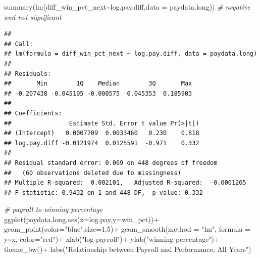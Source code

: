 \documentclass[
  12pt,
]{article}
\newenvironment{Shaded}{\begin{snugshade}}{\end{snugshade}}
\newcommand{\AttributeTok}[1]{\textcolor[rgb]{0.77,0.63,0.00}{#1}}
\newcommand{\CommentTok}[1]{\textcolor[rgb]{0.56,0.35,0.01}{\textit{#1}}}
\newcommand{\FloatTok}[1]{\textcolor[rgb]{0.00,0.00,0.81}{#1}}
\newcommand{\FunctionTok}[1]{\textcolor[rgb]{0.00,0.00,0.00}{#1}}
\newcommand{\NormalTok}[1]{#1}
\newcommand{\SpecialCharTok}[1]{\textcolor[rgb]{0.00,0.00,0.00}{#1}}
\newcommand{\StringTok}[1]{\textcolor[rgb]{0.31,0.60,0.02}{#1}}
\begin{document}
\begin{Shaded}
\begin{Highlighting}[]
\FunctionTok{summary}\NormalTok{(}\FunctionTok{lm}\NormalTok{(diff\_win\_pct\_next}\SpecialCharTok{\textasciitilde{}}\NormalTok{log.pay.diff,}\AttributeTok{data =}\NormalTok{ paydata.long)) }\CommentTok{\# negative and not significant}
\end{Highlighting}
\end{Shaded}

\begin{verbatim}
## 
## Call:
## lm(formula = diff_win_pct_next ~ log.pay.diff, data = paydata.long)
## 
## Residuals:
##       Min        1Q    Median        3Q       Max 
## -0.207438 -0.045105 -0.000575  0.045353  0.185903 
## 
## Coefficients:
##                Estimate Std. Error t value Pr(>|t|)
## (Intercept)   0.0007709  0.0033460   0.230    0.818
## log.pay.diff -0.0121974  0.0125591  -0.971    0.332
## 
## Residual standard error: 0.069 on 448 degrees of freedom
##   (60 observations deleted due to missingness)
## Multiple R-squared:  0.002101,   Adjusted R-squared:  -0.0001265 
## F-statistic: 0.9432 on 1 and 448 DF,  p-value: 0.332
\end{verbatim}

\begin{Shaded}
\begin{Highlighting}[]
\CommentTok{\# payroll to winning percentage}
\FunctionTok{ggplot}\NormalTok{(paydata.long,}\FunctionTok{aes}\NormalTok{(}\AttributeTok{x=}\NormalTok{log.pay,}\AttributeTok{y=}\NormalTok{win\_pct))}\SpecialCharTok{+}
  \FunctionTok{geom\_point}\NormalTok{(}\AttributeTok{color=}\StringTok{"blue"}\NormalTok{,}\AttributeTok{size=}\FloatTok{1.5}\NormalTok{)}\SpecialCharTok{+}
  \FunctionTok{geom\_smooth}\NormalTok{(}\AttributeTok{method =} \StringTok{"lm"}\NormalTok{, }\AttributeTok{formula =}\NormalTok{ y}\SpecialCharTok{\textasciitilde{}}\NormalTok{x, }\AttributeTok{color=}\StringTok{"red"}\NormalTok{)}\SpecialCharTok{+}
  \FunctionTok{xlab}\NormalTok{(}\StringTok{"log payroll"}\NormalTok{)}\SpecialCharTok{+}
  \FunctionTok{ylab}\NormalTok{(}\StringTok{"winning percentage"}\NormalTok{)}\SpecialCharTok{+}
  \FunctionTok{theme\_bw}\NormalTok{()}\SpecialCharTok{+}
  \FunctionTok{labs}\NormalTok{(}\StringTok{"Relationship between Payroll and Performance, All Years"}\NormalTok{)}
\end{Highlighting}
\end{Shaded}
\end{document}
